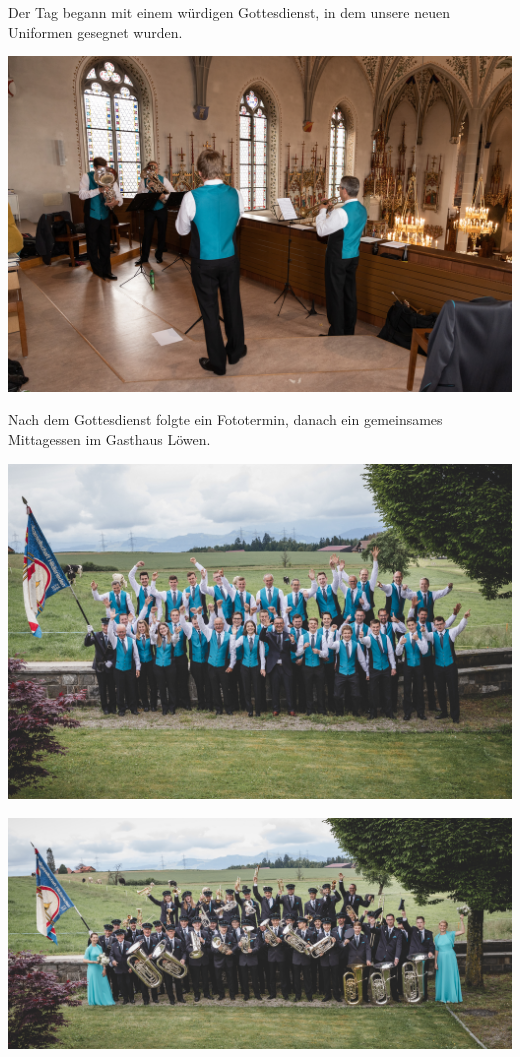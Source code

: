 \begin{history}
    Der Tag begann mit einem würdigen Gottesdienst, in dem unsere neuen
    Uniformen gesegnet wurden.

    \begin{MulticolFigure}
        \centering
        \includegraphics[width=0.93\linewidth]{./chap/2001-2024/2021/Kirchenquartett-1.jpg}
    \end{MulticolFigure}

    Nach dem Gottesdienst folgte ein Fototermin, danach ein gemeinsames
    Mittagessen im Gasthaus Löwen.

    \begin{MulticolFigure}
        \centering
        \includegraphics[width=0.93\linewidth]{./chap/2001-2024/2021/MGH-2021-Gilet.jpg}
    \end{MulticolFigure}

    \begin{MulticolFigure}
        \centering
        \includegraphics[width=0.93\linewidth]{./chap/2001-2024/2021/MGH-2021-lustig.jpg}
    \end{MulticolFigure}


\end{history}
